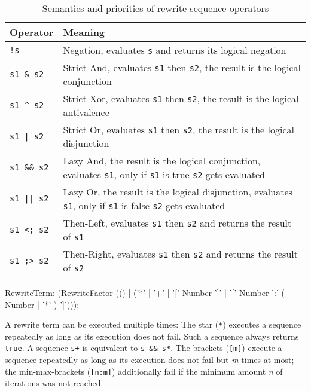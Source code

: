 \begin{table}[htbp]
    \begin{tabularx}{\linewidth}{l|X}
        \bf Operator & \bf Meaning \\\hline\hline
        \verb/!s/ & Negation, evaluates \texttt{s} and returns its logical negation\\\hline
        \verb/s1 & s2/ & Strict And, evaluates \texttt{s1} then \texttt{s2}, the result is the logical conjunction\\\hline
        \verb/s1 ^ s2/ & Strict Xor, evaluates \texttt{s1} then \texttt{s2}, the result is the logical antivalence\\\hline
        \verb/s1 | s2/ & Strict Or, evaluates \texttt{s1} then \texttt{s2}, the result is the logical disjunction\\\hline
        \verb/s1 && s2/ & Lazy And, the result is the logical conjunction, evaluates \texttt{s1}, only if \texttt{s1} is true \texttt{s2} gets evaluated\\\hline
        \verb/s1 || s2/ & Lazy Or, the result is the logical disjunction, evaluates \texttt{s1}, only if \texttt{s1} is false \texttt{s2} gets evaluated\\\hline
        \verb/s1 <; s2/ & Then-Left, evaluates \texttt{s1} then \texttt{s2} and returns the result of \texttt{s1}\\
		\verb/s1 ;> s2/ & Then-Right, evaluates \texttt{s1} then \texttt{s2} and returns the result of \texttt{s2}\\\hline
    \end{tabularx}    
    \caption{Semantics and priorities of rewrite sequence operators}
    \label{tbl:sequ:op}
\end{table}

\begin{rail}
  RewriteTerm: 
    (RewriteFactor (() | ('*' | '+' | '[' Number ']' | '[' Number ':' ( Number | '*' ) ']')));
\end{rail}

A rewrite term can be executed multiple times: The star (\texttt{*}) executes a sequence repeatedly as long as its execution does not fail. 
Such a sequence always returns \texttt{true}.
A sequence \verb#s+# is equivalent to \verb#s && s*#.
The brackets (\texttt{[m]}) execute a sequence repeatedly as long as its execution does not fail but \emph{m} times at most; the min-max-brackets (\texttt{[n:m]}) additionally fail if the minimum amount \emph{n} of iterations was not reached.

